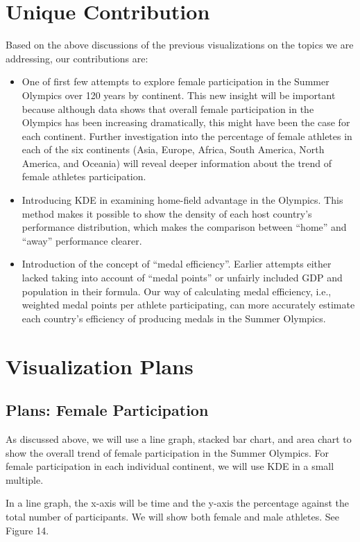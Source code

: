 \documentclass[12pt]{article}
\begin{document}
\section{Unique Contribution}
Based on the above discussions of the previous visualizations on the topics we are addressing, our contributions are:
\begin{itemize}
    \item One of first few attempts to explore female participation in the Summer Olympics over 120 years by continent. This new insight will be important because although data shows that overall female participation in the Olympics has been increasing dramatically, this might have been the case for each continent. Further investigation into the percentage of female athletes in each of the six continents (Asia, Europe, Africa, South America, North America, and Oceania) will reveal deeper information about the trend of female athletes participation. 
    
    \item Introducing KDE in examining home-field advantage in the Olympics. This method makes it possible to show the density of each host country’s performance distribution, which makes the comparison between “home” and “away” performance clearer. 
    
    \item Introduction of the concept of “medal efficiency”. Earlier attempts either lacked taking into account of “medal points” or unfairly included GDP and population in their formula. Our way of calculating medal efficiency, i.e., weighted medal points per athlete participating, can more accurately estimate each country’s efficiency of producing medals in the Summer Olympics. 
\end{itemize}

\section{Visualization Plans}
\subsection{Plans: Female Participation}
As discussed above, we will use a line graph, stacked bar chart, and area chart to show the overall trend of female participation in the Summer Olympics. For female participation in each individual continent, we will use KDE in a small multiple. 

In a line graph, the x-axis will be time and the y-axis the percentage against the total number of participants. We will show both female and male athletes. See Figure 14.
\end{document}
